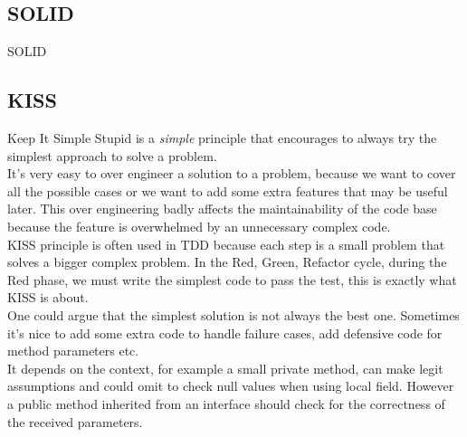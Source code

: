 \subsection{SOLID}\label{subsec:solid}
SOLID

\subsection{KISS}\label{subsec:kiss}
Keep It Simple Stupid is a \textit{simple} principle that encourages to
always try the simplest approach to solve a problem. \\
\newline
It's very easy to over engineer a solution to a problem, because we want
to cover all the possible cases or we want to add some extra
features that may be useful later.
This over engineering badly affects the maintainability of the code base
because the feature is overwhelmed by an unnecessary complex code. \\
\newline
KISS principle is often used in TDD because each step is a small
problem that solves a bigger complex problem.
In the Red, Green, Refactor cycle, during the Red phase, we must write
the simplest code to pass the test, this is exactly what KISS is about.
\\
\newline
One could argue that the simplest solution is not always the best one.
Sometimes it's nice to add some extra code to handle failure cases, add
defensive code for method parameters etc. \\
It depends on the context, for example a small private method, can make
legit assumptions and could omit to check null values when using
local field.
However a public method inherited from an interface should check for the
correctness of the received parameters.

